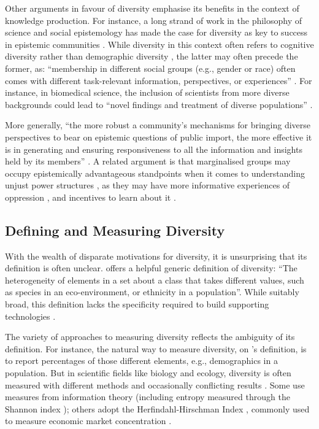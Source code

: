 Other arguments in favour of diversity emphasise its benefits in the context of knowledge production. For instance, a long strand of work in the philosophy of science and social epistemology has made the case for diversity as key to success in epistemic communities \cite{mill1998liberty,merton1942note,wylie2006introduction}. While diversity in this context often refers to cognitive diversity rather than demographic diversity \cite{page2008difference}, the latter may often precede the former, as: ``membership in different social groups (e.g., gender or race) often comes with different task-relevant information, perspectives, or experiences'' \cite{peters2021hidden}. For instance, in biomedical science, the inclusion of scientists from more diverse backgrounds could lead to ``novel findings and treatment of diverse populations'' \cite{swartz2019science}.

More generally, ``the more robust a community’s mechanisms for bringing diverse perspectives to bear on epistemic questions of public import, the more effective it is in generating and ensuring responsiveness to all the information and insights held by its members'' \cite{wylie2006introduction}. A related argument is that marginalised groups may occupy epistemically advantageous standpoints when it comes to understanding unjust power structures \cite{harding2004feminist,dror2023there,steel_multiple_2018}, as they may have more informative experiences of oppression \cite{mills2015blackness}, and incentives to learn about it \cite{jaggar1983feminist}.

\subsection{Defining and Measuring Diversity}
With the wealth of disparate motivations for diversity, it is unsurprising that its definition is often unclear. \textcite{page_diversity_2010} offers a helpful generic definition of diversity: ``The heterogeneity of elements in a set about a class that takes different values, such as species in an eco-environment, or ethnicity in a population''. While suitably broad, this definition lacks the specificity required to build supporting technologies \cite{hupont2021diverse,page_diversity_2010}. 

The variety of approaches to measuring diversity reflects the ambiguity of its definition. For instance, the natural way to measure diversity, on \textcite{page_diversity_2010}'s definition, is to report percentages of those different elements, e.g., demographics in a population. But in scientific fields like biology and ecology, diversity is often measured with different methods and occasionally conflicting results \cite{xu2020diversity}. Some use measures from information theory (including entropy measured through the Shannon index \cite{shannon1948mathematical}); others adopt the Herfindahl-Hirschman Index \cite{rhoades1993herfindahl}, commonly used to measure economic market concentration \cite{budescu2012measure,acuna2021ai,shannon1948mathematical,rhoades1993herfindahl}.

